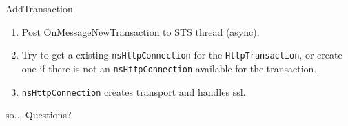 \documentclass{beamer}
\begin{document}
\begin{frame}{AddTransaction}
  \begin{enumerate}
  \item Post OnMessageNewTransaction to STS thread (async).
  \item Try to get a existing \texttt{nsHttpConnection} for the \texttt{HttpTransaction}, or create one if there is not an \texttt{nsHttpConnection} available for the transaction.
  \item \texttt{nsHttpConnection} creates transport and handles ssl.
  \end{enumerate}
\end{frame}

\begin{frame}{so...}
  \large Questions?
\end{frame}
\end{document}
